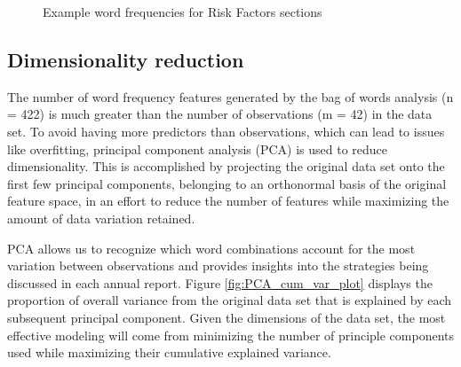 \documentclass{article}
\begin{document}
\begin{figure}[ht]
    \centering
    \qquad
    \caption{Example word frequencies for Risk Factors sections}%
    \label{fig:wordcloud}%
\end{figure}

\subsection{Dimensionality reduction}
The number of word frequency features generated by the bag of words analysis (n = 422) is much greater than the number of observations (m = 42) in the data set. To avoid having more predictors than observations, which can lead to issues like overfitting, principal component analysis (PCA) is used to reduce dimensionality. This is accomplished by projecting the original data set onto the first few principal components, belonging to an orthonormal basis of the original feature space, in an effort to reduce the number of features while maximizing the amount of data variation retained.

PCA allows us to recognize which word combinations account for the most variation between observations and provides insights into the strategies being discussed in each annual report. Figure \ref{fig:PCA_cum_var_plot} displays the proportion of overall variance from the original data set that is explained by each subsequent principal component. Given the dimensions of the data set, the most effective modeling will come from minimizing the number of principle components used while maximizing their cumulative explained variance.
\end{document}
